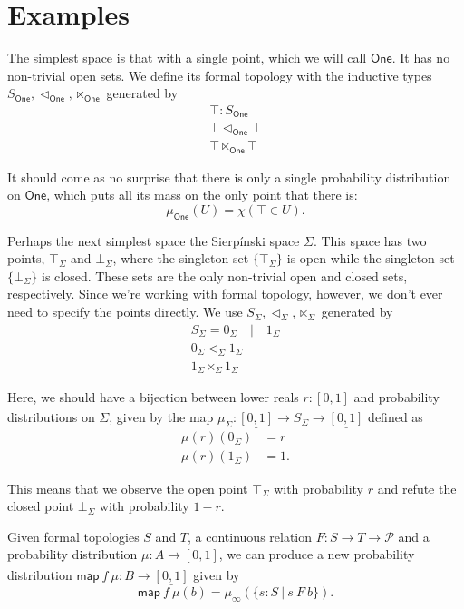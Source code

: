 \documentclass{article}           %
\newcommand{\cov}{\vartriangleleft}
\newcommand{\Prop}{\mathcal{P}}
\newcommand{\map}[2]{\mathsf{map}\ {#1}\ {#2}}
\newcommand{\suchthat}{\ |\ }
\newcommand{\One}{\mathsf{One}}
\begin{document}
\section{Examples}

The simplest space is that with a single point, which we will call $\One$. It has no non-trivial open sets. We define its formal topology with the inductive types $S_\One, \cov_\One, \ltimes_\One$ generated by
\begin{gather*}
\top : S_\One
\\ \top \cov_\One \top
\\ \top \ltimes_\One \top
\end{gather*}

It should come as no surprise that there is only a single probability distribution on $\One$, which puts all its mass on the only point that there is:
\[
\mu_\One(U) = \chi(\top \in U).
\]

Perhaps the next simplest space the Sierpínski space $\Sigma$. This space has two points, $\top_\Sigma$ and $\bot_\Sigma$, where the singleton set $\{\top_\Sigma\}$ is open while the singleton set $\{ \bot_\Sigma \}$ is closed. These sets are the only non-trivial open and closed sets, respectively. Since we're working with formal topology, however, we don't ever need to specify the points directly. We use $S_\Sigma, \cov_\Sigma, \ltimes_\Sigma$ generated by
\begin{gather*}
S_\Sigma = 0_\Sigma \quad | \quad 1_\Sigma
\\ 0_\Sigma \cov_\Sigma 1_\Sigma
\\ 1_\Sigma \ltimes_\Sigma 1_\Sigma
\end{gather*}

Here, we should have a bijection between lower reals $r : \underline{[0,1]}$ and probability distributions on $\Sigma$, given by the map $\mu_\Sigma : \underline{[0,1]} \to S_\Sigma \to \underline{[0,1]}$ defined as
\begin{align*}
    \mu(r)(0_\Sigma) &= r
\\  \mu(r)(1_\Sigma) &= 1.
\end{align*}

This means that we observe the open point $\top_\Sigma$ with probability $r$ and refute the closed point $\bot_\Sigma$ with probability $1 - r$.

Given formal topologies $S$ and $T$, a continuous relation $F : S \to T \to \Prop$ and a probability distribution $\mu : A \to \underline{[0,1]}$, we can produce a new probability distribution $\map{f}{\mu} : B \to \underline{[0,1]}$ given by
\[
\map{f}{\mu}(b) = \mu_\infty(\{ s : S \suchthat s\ F\ b \}).
\]
\end{document}

